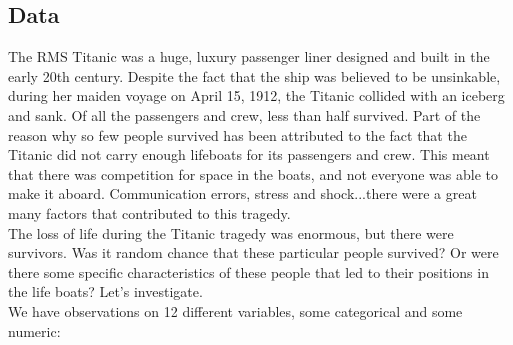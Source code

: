 \documentclass[11pt]{article}
\begin{document}
\subsection*{Data}

The RMS Titanic was a huge, luxury passenger liner designed and built in the early 20th century. Despite the fact that the ship was believed to be unsinkable, during her maiden voyage on April 15, 1912, the Titanic collided with an iceberg and sank. Of all the passengers and crew, less than half survived. Part of the reason why so few people survived has been attributed to the fact that the Titanic did not carry enough lifeboats for its passengers and crew. This meant that there was competition for space in the boats, and not everyone was able to make it aboard. Communication errors, stress and shock...there were a great many factors that contributed to this tragedy.\\

\noindent The loss of life during the Titanic tragedy was enormous, but there were survivors. Was it random chance that these particular people survived? Or were there some specific characteristics of these people that led to their positions in the life boats? Let's investigate.\\

\noindent We have observations on 12 different variables, some categorical and some numeric:
\end{document}
